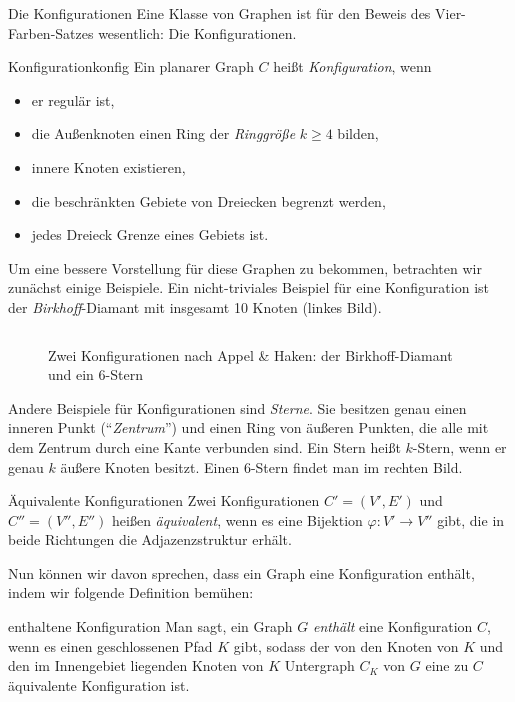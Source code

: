   \begin{section}{Die Konfigurationen}
   Eine Klasse von Graphen ist für den Beweis des Vier-Farben-Satzes wesentlich: Die Konfigurationen. 
   
   \begin{definitionl}{Konfiguration}{konfig}
    Ein planarer Graph $C$ heißt \textit{Konfiguration}, wenn
    \begin{itemize}
     \item er regulär ist,
     \item die Außenknoten einen Ring der \textit{Ringgröße} $k \geq 4$ bilden,
     \item innere Knoten existieren,
     \item die beschränkten Gebiete von Dreiecken begrenzt werden,
     \item jedes Dreieck Grenze eines Gebiets ist.
    \end{itemize}
   \end{definitionl}
   
  Um eine bessere Vorstellung für diese Graphen zu bekommen, betrachten wir zunächst einige Beispiele. Ein nicht-triviales Beispiel für eine Konfiguration ist der \textit{Birkhoff}-Diamant mit insgesamt 10 Knoten (linkes Bild).
   
  \begin{figure}[hb]
   \label{AHkonfig}
    \[  \]
    \caption[Zwei Konfigurationen nach Appel \& Haken: der Birkhoff-Diamant und ein $6$-Stern]{Zwei Konfigurationen nach Appel \& Haken: der Birkhoff-Diamant und ein $6$-Stern}
  \end{figure}
 
   
  Andere Beispiele für Konfigurationen sind \textit{Sterne}. Sie besitzen genau einen inneren Punkt (``\textit{Zentrum}'') und einen Ring von äußeren Punkten, die alle mit dem Zentrum durch eine Kante verbunden sind. Ein Stern heißt $k$-Stern, wenn er genau $k$ äußere Knoten besitzt. Einen $6$-Stern findet man im rechten Bild.
  
  \begin{definition}{Äquivalente Konfigurationen}
   Zwei Konfigurationen $C'=(V',E')$ und $C''=(V'',E'')$ heißen \textit{äquivalent}, wenn es eine Bijektion $\varphi : V' \rightarrow V''$ gibt, die in beide Richtungen die Adjazenzstruktur erhält.
  \end{definition}
  
  Nun können wir davon sprechen, dass ein Graph eine Konfiguration enthält, indem wir folgende Definition bemühen:
  
  \begin{definition}{enthaltene Konfiguration}
   Man sagt, ein Graph $G$ \textit{enthält} eine Konfiguration $C$, wenn es einen geschlossenen Pfad $K$ gibt, sodass der von den Knoten von $K$ und den im Innengebiet liegenden Knoten von $K$ Untergraph $C_K$ von $G$ eine zu $C$ äquivalente Konfiguration ist.
  \end{definition}


  \end{section}
\newpage